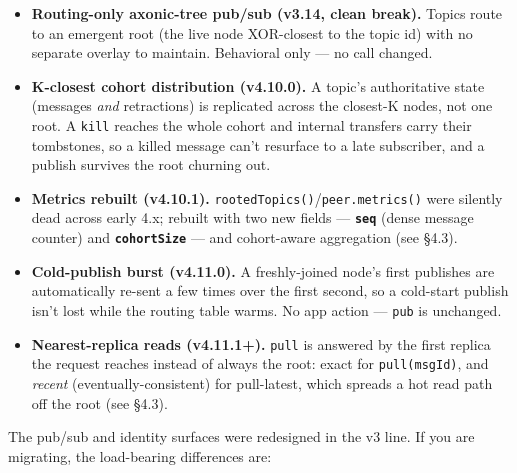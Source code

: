 \documentclass[
  nobib]{tufte-handout}
\providecommand{\tightlist}{%
  \setlength{\itemsep}{0pt}\setlength{\parskip}{0pt}}
\renewcommand{\subsubsection}[1]{\medskip\par\noindent{\normalsize\bfseries #1}\par\nobreak\smallskip}
\begin{document}
\begin{itemize}
\tightlist
\item
  \textbf{Routing-only axonic-tree pub/sub (v3.14, clean break).} Topics
  route to an emergent root (the live node XOR-closest to the topic id)
  with no separate overlay to maintain. Behavioral only --- no call
  changed.
\item
  \textbf{K-closest cohort distribution (v4.10.0).} A topic's
  authoritative state (messages \emph{and} retractions) is replicated
  across the closest-K nodes, not one root. A \texttt{kill} reaches the
  whole cohort and internal transfers carry their tombstones, so a
  killed message can't resurface to a late subscriber, and a publish
  survives the root churning out.
\item
  \textbf{Metrics rebuilt (v4.10.1).}
  \texttt{rootedTopics()}/\texttt{peer.metrics()} were silently dead
  across early 4.x; rebuilt with two new fields ---
  \textbf{\texttt{seq}} (dense message counter) and
  \textbf{\texttt{cohortSize}} --- and cohort-aware aggregation (see
  §4.3).
\item
  \textbf{Cold-publish burst (v4.11.0).} A freshly-joined node's first
  publishes are automatically re-sent a few times over the first second,
  so a cold-start publish isn't lost while the routing table warms. No
  app action --- \texttt{pub} is unchanged.
\item
  \textbf{Nearest-replica reads (v4.11.1+).} \texttt{pull} is answered
  by the first replica the request reaches instead of always the root:
  exact for \texttt{pull(msgId)}, and \emph{recent}
  (eventually-consistent) for pull-latest, which spreads a hot read path
  off the root (see §4.3).
\end{itemize}

\subsubsection{What changed since v2.x}\label{what-changed-since-v2.x}

The pub/sub and identity surfaces were redesigned in the v3 line. If you
are migrating, the load-bearing differences are:
\end{document}
